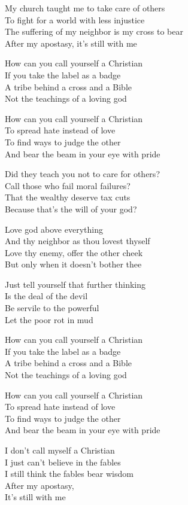 \begin{lyrics}
My church taught me to take care of others\\
To fight for a world with less injustice\\
The suffering of my neighbor is my cross to bear\\
After my apostasy, it's still with me

How can you call yourself a Christian\\
If you take the label as a badge\\
A tribe behind a cross and a Bible\\
Not the teachings of a loving god

How can you call yourself a Christian\\
To spread hate instead of love\\
To find ways to judge the other\\
And bear the beam in your eye with pride

Did they teach you not to care for others?\\
Call those who fail moral failures?\\
That the wealthy deserve tax cuts\\
Because that's the will of your god?

Love god above everything\\
And thy neighbor as thou lovest thyself\\
Love thy enemy, offer the other cheek\\
But only when it doesn't bother thee

Just tell yourself that further thinking\\
Is the deal of the devil\\
Be servile to the powerful\\
Let the poor rot in mud

How can you call yourself a Christian\\
If you take the label as a badge\\
A tribe behind a cross and a Bible\\
Not the teachings of a loving god

How can you call yourself a Christian\\
To spread hate instead of love\\
To find ways to judge the other\\
And bear the beam in your eye with pride

I don't call myself a Christian\\
I just can't believe in the fables\\
I still think the fables bear wisdom\\
After my apostasy,\\
It's still with me
\end{lyrics}

